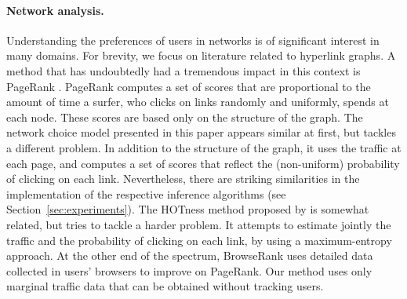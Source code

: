 \paragraph{Network analysis.}
Understanding the preferences of users in networks is of significant interest in many domains.
For brevity, we focus on literature related to hyperlink graphs.
A method that has undoubtedly had a tremendous impact in this context is PageRank \citep{brin1998anatomy}.
PageRank computes a set of scores that are proportional to the amount of time a surfer, who clicks on links randomly and uniformly, spends at each node.
These scores are based only on the structure of the graph.
The network choice model presented in this paper appears similar at first, but tackles a different problem.
In addition to the structure of the graph, it uses the traffic at each page, and computes a set of scores that reflect the (non-uniform) probability of clicking on each link.
Nevertheless, there are striking similarities in the implementation of the respective inference algorithms (see Section~\ref{sec:experiments}).
The HOTness method proposed by \citet{tomlin2003new} is somewhat related, but tries to tackle a harder problem.
It attempts to estimate jointly the traffic and the probability of clicking on each link, by using a maximum-entropy approach.
At the other end of the spectrum, BrowseRank \citep{liu2008browserank} uses detailed data collected in users' browsers to improve on PageRank.
Our method uses only marginal traffic data that can be obtained without tracking users.
